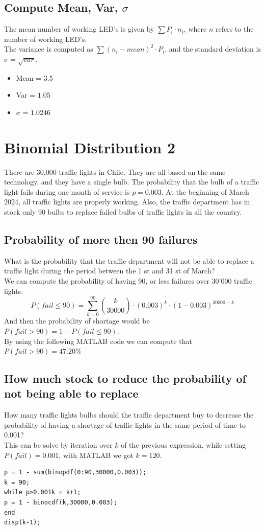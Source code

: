 \documentclass{article}
\begin{document}
\subsection{Compute Mean, Var, $\sigma$}
The mean number of working LED's is given by $\sum{P_i \cdot n_i}$, where $n$ refers to the number of working LED's. \\
The variance is computed as $\sum{(n_i - mean)^2} \cdot P_i$, and the standard deviation is $\sigma = \sqrt{var}$.\\
\begin{itemize}
    \item Mean = $3.5$
    \item Var = $1.05$
    \item $\sigma$ = $1.0246$
\end{itemize}



\newpage
\section{Binomial Distribution 2}
There are 30,000 traffic lights in Chile. They are all based on the same
technology, and they have a single bulb. The probability that the bulb of a
traffic light fails during one month of service is $ p=0.003$.
At the beginning of March 2024, all traffic lights are properly working.
Also, the traffic department has in stock only 90 bulbs to replace failed
bulbs of traffic lights in all the country.

\subsection{Probability of more then 90 failures}
What is the probability that the
traffic department will not be able to replace a traffic light during the
period between the 1 st and 31 st of March? \\
We can compute the probability of having 90, or less failures over 30'000 traffic lights:
\begin{equation}
    P(fail \leq 90) = \sum_{k=0}^{90}{{k \choose 30000} \cdot (0.003)^k \cdot (1-0.003)^{30000-k}}
\end{equation}
And then the probability of shortage would be $P(fail>90) = 1 - P(fail \leq 90)$. \\
By using the following MATLAB code we can compute that $P(fail>90) = 47.20\%$


\subsection{How much stock to reduce the probability of not being able to replace}
How many traffic lights bulbs should the traffic department buy to
decrease the probability of having a shortage of traffic lights in the same
period of time to 0.001? \\
This can be solve by iteration over $k$ of the previous expression, while setting $P(fail) = 0.001$, with MATLAB we got $k=120$.
\begin{lstlisting}
p = 1 - sum(binopdf(0:90,30000,0.003));
k = 90; 
while p>0.001k = k+1;
p = 1 - binocdf(k,30000,0.003);
end
disp(k-1);
\end{lstlisting}
\end{document}
